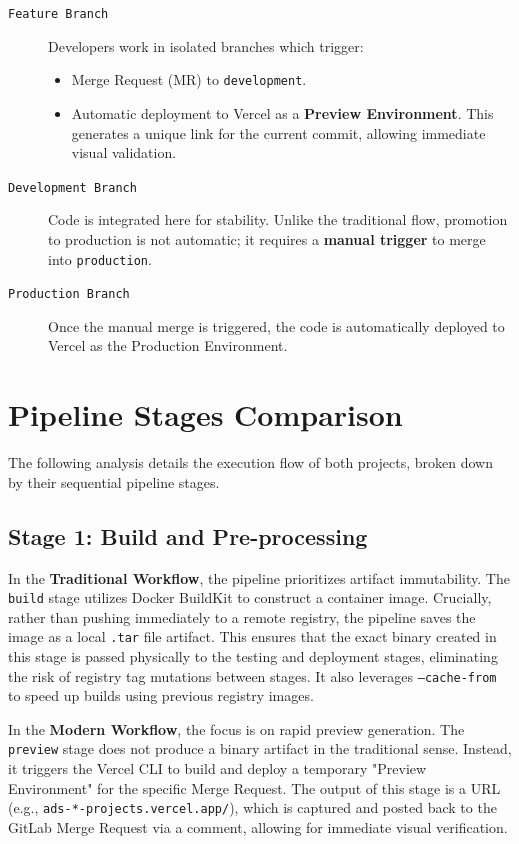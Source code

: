 \documentclass[a4paper,12pt]{report}
\begin{document}
    \begin{description}
        \item[\texttt{Feature Branch}]
        Developers work in isolated branches which trigger:
        \begin{itemize}
            \item Merge Request (MR) to \texttt{development}.
            \item Automatic deployment to Vercel as a \textbf{Preview Environment}. This generates a unique link for the current commit, allowing immediate visual validation.
        \end{itemize}
        
        \item[\texttt{Development Branch}]
        Code is integrated here for stability. Unlike the traditional flow, promotion to production is not automatic; it requires a \textbf{manual trigger} to merge into \texttt{production}.
        
        \item[\texttt{Production Branch}]
        Once the manual merge is triggered, the code is automatically deployed to Vercel as the Production Environment.
    \end{description}
  
  \newpage  
  \section{Pipeline Stages Comparison}

The following analysis details the execution flow of both projects, broken down by their sequential pipeline stages.

\subsection{Stage 1: Build and Pre-processing}

In the \textbf{Traditional Workflow}, the pipeline prioritizes artifact immutability. The \texttt{build} stage utilizes Docker BuildKit to construct a container image. Crucially, rather than pushing immediately to a remote registry, the pipeline saves the image as a local \texttt{.tar} file artifact. This ensures that the exact binary created in this stage is passed physically to the testing and deployment stages, eliminating the risk of registry tag mutations between stages. It also leverages \texttt{--cache-from} to speed up builds using previous registry images.

In the \textbf{Modern Workflow}, the focus is on rapid preview generation. The \texttt{preview} stage does not produce a binary artifact in the traditional sense. Instead, it triggers the Vercel CLI to build and deploy a temporary "Preview Environment" for the specific Merge Request. The output of this stage is a URL (e.g., \texttt{ads-*-projects.vercel.app/}), which is captured and posted back to the GitLab Merge Request via a comment, allowing for immediate visual verification.
\end{document}
